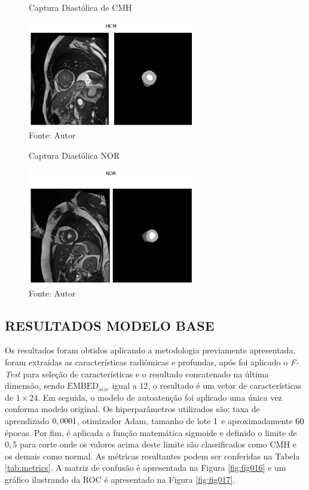 \begin{figure}[h!]
    \caption{Captura Diastólica de CMH}
    \centering
    \includegraphics[width=0.65\textwidth]{figures/fig019.png}
    \caption*{Fonte: Autor}
    \label{fig:fig019}
\end{figure}

\begin{figure}[h!]
    \centering
    \caption{Captura Diastólica NOR}
    \includegraphics[width=0.65\textwidth]{figures/fig020.png}
    \caption*{Fonte: Autor}
    \label{fig:fig020}
\end{figure}

\subsection{RESULTADOS MODELO BASE}
\label{subsec:resultados_acdc_base}

Os resultados foram obtidos aplicando a metodologia previamente apresentada, foram extraídas as características radiômicas e profundas, após foi aplicado o \textit{F-Test} para seleção de características e o resultado concatenado na última dimensão, sendo $\text{EMBED}_{size}$ igual a $12$, o resultado é um vetor de características de $1\times24$. Em seguida, o modelo de autoatenção foi aplicado uma única vez conforma modelo original. Os hiperparâmetros utilizados são: taxa de aprendizado $0,0001$, otimizador \gls{Adam}, tamanho de lote $1$ e aproximadamente $60$ épocas. Por fim, é aplicada a função matemática sigmoide e definido o limite de $0,5$ para corte onde os valores acima deste limite são classificados como \gls{CMH} e os demais como normal. As métricas resultantes podem ser conferidas na Tabela \ref{tab:metrics}. A matriz de confusão é apresentada na Figura \ref{fig:fig016} e um gráfico ilustrando da \gls{ROC} é apresentado na Figura \ref{fig:fig017}.
\newline

